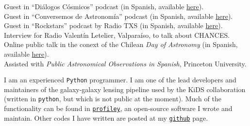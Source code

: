 \documentclass[11pt]{article}
\begin{document}
\noindent
{} Guest in ``Di\'alogos C\'osmicos'' podcast (in Spanish, available \href{https://www.youtube.com/watch?v=6hFChKVBkH8&pp=ygURZGlhbG9nb3MgY29zbWljb3M%3D}{here}).\\
 Guest in ``Conversemos de Astronomía'' podcast (in Spanish, available \href{https://open.spotify.com/episode/4PBTlnI3ufDtBwXIGee5mp?si=KGS43HFnSuiVdVPYaoBMqA}{here}).\\
 Guest in ``Rockstars'' podcast by Radio TXS (in Spanish, available \href{https://soundcloud.com/txsplus/rockstars-con-gabriel-leon-y-cristobal-sifon-4-de-noviembre-del-2022?utm_source=Email&utm_campaign=social_sharing&utm_medium=widgetutm_content=https%3A%2F%2Fsoundcloud.com%2Ftxsplus%2Frockstars-con-gabriel-leon-y-cristobal-sifon-4-de-noviembre-del-2022}{here}).\\
 Interview for Radio Valent\'in Letelier, Valparaíso, to talk about CHANCES.\\
 Online public talk in the conext of the Chilean \textit{Day of Astronomy} (in Spanish, available \href{https://www.youtube.com/watch?v=MgrKSd6JWkE}{here}).\\
 Assisted with \emph{Public Astronomical Observations in Spanish}, Princeton University.\\




\noindent
I am an experienced \texttt{Python} programmer. 
I am one of the lead 
developers and maintainers of the galaxy-galaxy lensing pipeline used by the 
KiDS collaboration (written in \texttt{python}, but which is not public at the 
moment). Much of the functionality can be found in \href{https://profiley.readthedocs.io/en/latest/index.html}{\texttt{profiley}}, an open-source software I wrote and maintain. Other codes I have written are posted at my \href{https://github.com/cristobal-sifon}{\texttt{github}} page.\\
\end{document}
